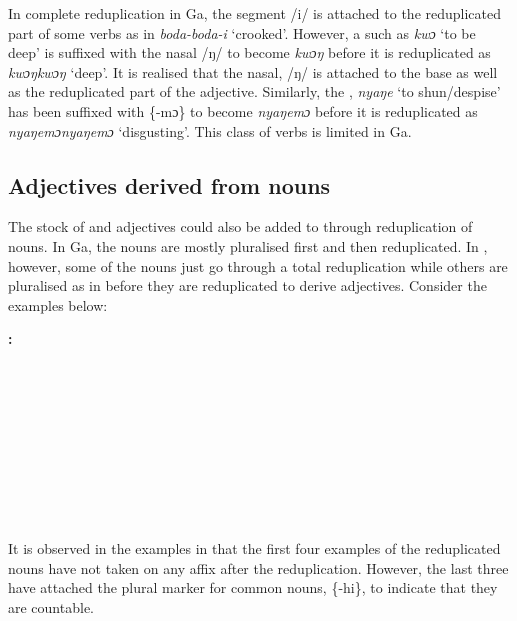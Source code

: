 \documentclass[output=paper,
modfonts
]{langscibook}
\begin{document}
In complete reduplication in Ga, the segment /i/ is attached to the reduplicated part of some verbs as in \textit{boda-boda-i} ‘crooked’. However, a  such as \textit{kwɔ} ‘to be deep’ is suffixed with the  nasal /ŋ/ to become \textit{kwɔŋ} before it is reduplicated as \textit{kwɔŋkwɔŋ} ‘deep’. It is realised that the  nasal, /ŋ/ is attached to the base as well as the reduplicated part of the adjective. Similarly, the  , \textit{nyaŋe} ‘to shun/despise’ has been suffixed with \{-mɔ\} to become \textit{nyaŋemɔ} before it is reduplicated as \textit{nyaŋemɔnyaŋemɔ} ‘disgusting’. This class of verbs is limited in Ga.


\subsection{Adjectives derived from nouns}\label{sec:caesar:2.2} 

The stock of  and  adjectives could also be added to through reduplication of nouns. In Ga, the nouns are mostly pluralised first and then reduplicated. In , however, some of the nouns just go through a total reduplication while others are pluralised as in  before they are reduplicated to derive adjectives. Consider the  examples below: 


\ea\label{ex:caesar:5}
\textbf{:}\\ 
\\
\\
\\
\\
\\
\\
\\
\\
\\ 
\z


It is observed in the  examples in  that the first four examples of the reduplicated nouns have not taken on any affix after the reduplication. However, the last three have attached the plural marker for common nouns, \{-hi\}, to indicate that they are countable.
\end{document}
